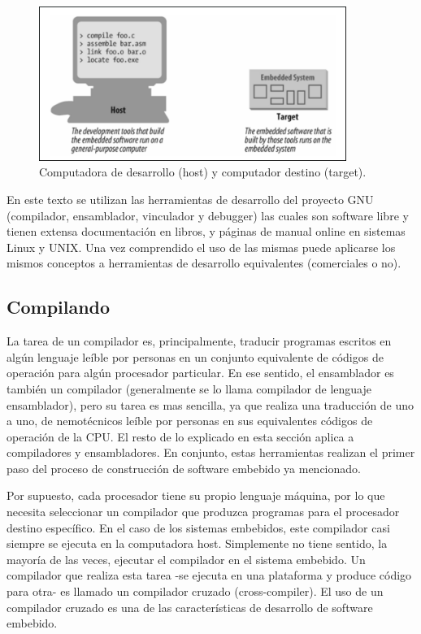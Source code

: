 \documentclass[output=paper, 
colorlinks,
citecolor=brown,
newtxmath
]{langscibook}
\begin{document}
\begin{figure}[H]
\includegraphics[width=10cm]{images/host_target.png}
\caption{Computadora de desarrollo (host) y computador destino (target).}
\label{fig:compilacion2}
\end{figure}

En este texto se utilizan las herramientas de desarrollo del proyecto GNU
(compilador, ensamblador, vinculador y debugger) las cuales son software libre
y tienen extensa documentación en libros, y páginas de manual online en sistemas
Linux y UNIX. Una vez comprendido
el uso de las mismas puede aplicarse los mismos conceptos a herramientas
de desarrollo equivalentes (comerciales o no).

\subsection {Compilando}

La tarea de un compilador es, principalmente, traducir programas escritos en 
algún lenguaje leíble por personas en un conjunto equivalente
de códigos de operación para algún procesador particular. En ese sentido,
el ensamblador es también un compilador (generalmente se lo llama
compilador de lenguaje ensamblador), pero su tarea es mas sencilla, ya que
realiza una traducción de uno a uno, de nemotécnicos leíble por personas
en sus equivalentes códigos de operación de la CPU. El resto de lo explicado en esta sección
aplica a compiladores y ensambladores. En conjunto, estas herramientas
realizan el primer paso del proceso de construcción de software embebido
ya mencionado.

Por supuesto, cada procesador tiene su propio lenguaje máquina, por lo que
necesita seleccionar un compilador que produzca programas para el procesador
destino específico. En el caso de los sistemas embebidos,  este compilador
casi siempre se ejecuta en la computadora host. Simplemente no tiene sentido,
la mayoría de las veces, ejecutar el compilador en el sistema embebido.
Un compilador que realiza esta tarea -se ejecuta en una plataforma  y produce
código para otra- es llamado un compilador cruzado (cross-compiler). El uso de
un compilador cruzado es una de las características de desarrollo de software
embebido.
\end{document}
